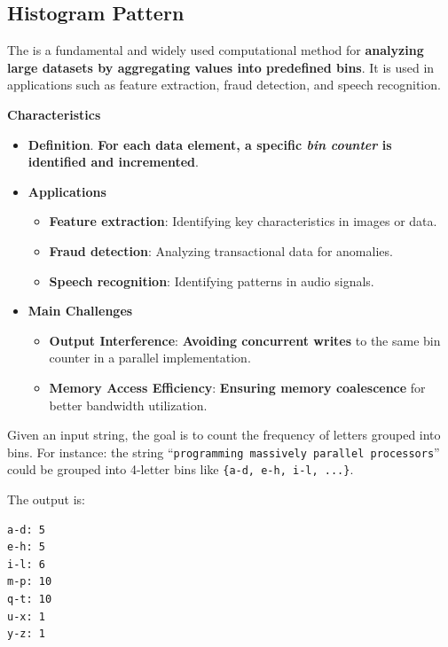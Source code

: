\subsection{Histogram Pattern}

The  is a fundamental and widely used computational method for \textbf{analyzing large datasets by aggregating values into predefined bins}. It is used in applications such as feature extraction, fraud detection, and speech recognition.

\highspace
\begin{flushleft}
    \textcolor{Green3}{ \textbf{Characteristics}}
\end{flushleft}
\begin{itemize}
    \item[\textcolor{Red2}{\faIcon{book}}] \textcolor{Red2}{\textbf{Definition}}. \textbf{For each data element, a specific \emph{bin counter} is identified and incremented}.

    \item[\textcolor{Green3}{\faIcon{tools}}] \textcolor{Green3}{\textbf{Applications}}
    \begin{itemize}
        \item \textbf{Feature extraction}: Identifying key characteristics in images or data.
        \item \textbf{Fraud detection}: Analyzing transactional data for anomalies.
        \item \textbf{Speech recognition}: Identifying patterns in audio signals.
    \end{itemize}

    \item[\textcolor{Red2}{\faIcon{question-circle}}] \textcolor{Red2}{\textbf{Main Challenges}}
    \begin{itemize}
        \item[\textcolor{Red2}{\faIcon{question}}] \textcolor{Red2}{\textbf{Output Interference}}: \textbf{Avoiding concurrent writes} to the same bin counter in a parallel implementation.
        \item[\textcolor{Red2}{\faIcon{question}}] \textcolor{Red2}{\textbf{Memory Access Efficiency}}: \textbf{Ensuring memory coalescence} for better bandwidth utilization.
    \end{itemize}
\end{itemize}

\begin{examplebox}
    Given an input string, the goal is to count the frequency of letters grouped into bins. For instance: the string ``\texttt{programming massively parallel processors}'' could be grouped into 4-letter bins like \texttt{\{a-d, e-h, i-l, ...\}}.

    The output is:
    \begin{lstlisting}
a-d: 5
e-h: 5
i-l: 6
m-p: 10
q-t: 10
u-x: 1
y-z: 1\end{lstlisting}
\end{examplebox}

